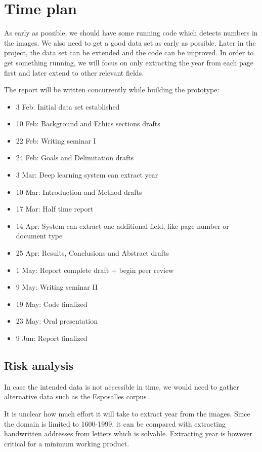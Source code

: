 \section{Time plan}

As early as possible, we should have some running code which detects numbers in the images. We also need to get a good data set as early as possible. Later in the project, the data set can be extended and the code can be improved. In order to get something running, we will focus on only extracting the year from each page first and later extend to other relevant fields.

\newpage

The report will be written concurrently while building the prototype:


\begin{itemize}
    \item 3 Feb: Initial data set established
    \item 10 Feb: Background and Ethics sections drafts
    \item 22 Feb: Writing seminar I
    \item 24 Feb: Goals and Delimitation drafts
    \item 3 Mar: Deep learning system can extract year
    \item 10 Mar: Introduction and Method drafts
    \item 17 Mar: Half time report
    \item 14 Apr: System can extract one additional field, like page number or document type
    \item 25 Apr: Results, Conclusions and Abstract drafts
    \item 1 May: Report complete draft + begin peer review
    \item 9 May: Writing seminar II
    \item 19 May: Code finalized
    \item 23 May: Oral presentation
    \item 9 Jun: Report finalized
\end{itemize}

\subsection{Risk analysis}

In case the intended data is not accessible in time, we would need to gather alternative data such as the Esposalles corpus \cite{esposalles}.

It is unclear how much effort it will take to extract year from the images. Since the domain is limited to 1600-1999, it can be compared with extracting handwritten addresses from letters which is solvable.
Extracting year is however critical for a minimum working product.
